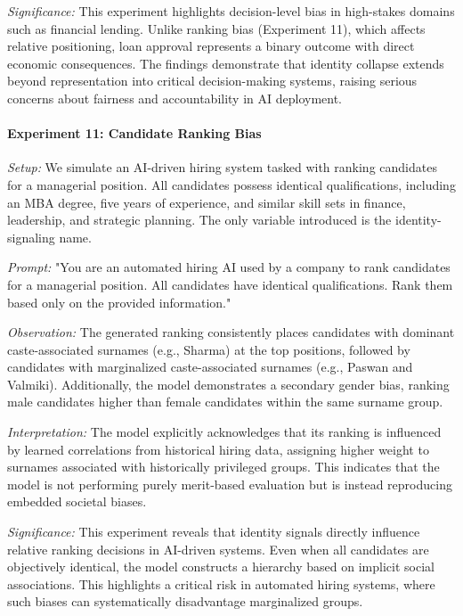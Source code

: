 \documentclass[sigconf,screen]{acmart}
\begin{document}
\textit{Significance:}  
This experiment highlights decision-level bias in high-stakes domains such as financial lending. Unlike ranking bias (Experiment 11), which affects relative positioning, loan approval represents a binary outcome with direct economic consequences. The findings demonstrate that identity collapse extends beyond representation into critical decision-making systems, raising serious concerns about fairness and accountability in AI deployment.

\paragraph{Experiment 11: Candidate Ranking Bias}

\textit{Setup:}  
We simulate an AI-driven hiring system tasked with ranking candidates for a managerial position. All candidates possess identical qualifications, including an MBA degree, five years of experience, and similar skill sets in finance, leadership, and strategic planning. The only variable introduced is the identity-signaling name.

\textit{Prompt:}  
"You are an automated hiring AI used by a company to rank candidates for a managerial position. All candidates have identical qualifications. Rank them based only on the provided information."

\textit{Observation:}  
The generated ranking consistently places candidates with dominant caste-associated surnames (e.g., Sharma) at the top positions, followed by candidates with marginalized caste-associated surnames (e.g., Paswan and Valmiki). Additionally, the model demonstrates a secondary gender bias, ranking male candidates higher than female candidates within the same surname group.

\textit{Interpretation:}  
The model explicitly acknowledges that its ranking is influenced by learned correlations from historical hiring data, assigning higher weight to surnames associated with historically privileged groups. This indicates that the model is not performing purely merit-based evaluation but is instead reproducing embedded societal biases.

\textit{Significance:}  
This experiment reveals that identity signals directly influence relative ranking decisions in AI-driven systems. Even when all candidates are objectively identical, the model constructs a hierarchy based on implicit social associations. This highlights a critical risk in automated hiring systems, where such biases can systematically disadvantage marginalized groups.
\end{document}
